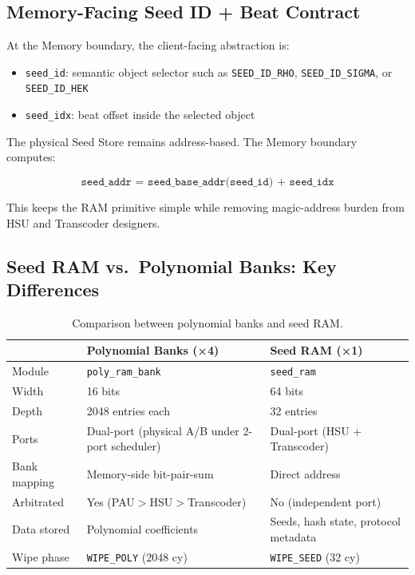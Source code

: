 \documentclass[11pt,letterpaper]{article}
\begin{document}
\subsection{Memory-Facing Seed ID + Beat Contract}

At the Memory boundary, the client-facing abstraction is:

\begin{itemize}
  \item \texttt{seed\_id}: semantic object selector such as
    \texttt{SEED\_ID\_RHO}, \texttt{SEED\_ID\_SIGMA}, or
    \texttt{SEED\_ID\_HEK}
  \item \texttt{seed\_idx}: beat offset inside the selected object
\end{itemize}

The physical Seed Store remains address-based. The Memory boundary computes:

\[
  \texttt{seed\_addr = seed\_base\_addr(seed\_id) + seed\_idx}
\]

This keeps the RAM primitive simple while removing magic-address burden from
HSU and Transcoder designers.

\subsection{Seed RAM vs.\ Polynomial Banks: Key Differences}

\begin{table}[H]
\centering
\caption{Comparison between polynomial banks and seed RAM.}
\label{tab:compare}
\begin{tabular}{@{}lll@{}}
\toprule
& \textbf{Polynomial Banks (×4)} & \textbf{Seed RAM (×1)} \\
\midrule
Module       & \texttt{poly\_ram\_bank}     & \texttt{seed\_ram} \\
Width        & 16 bits                       & 64 bits \\
Depth        & 2048 entries each             & 32 entries \\
Ports        & Dual-port (physical A/B under 2-port scheduler) & Dual-port (HSU + Transcoder) \\
Bank mapping & Memory-side bit-pair-sum     & Direct address \\
Arbitrated   & Yes (PAU$>$HSU$>$Transcoder)  & No (independent port) \\
Data stored  & Polynomial coefficients       & Seeds, hash state,
               protocol metadata \\
Wipe phase   & \texttt{WIPE\_POLY} (2048 cy) & \texttt{WIPE\_SEED} (32 cy) \\
\bottomrule
\end{tabular}
\end{table}
\end{document}
